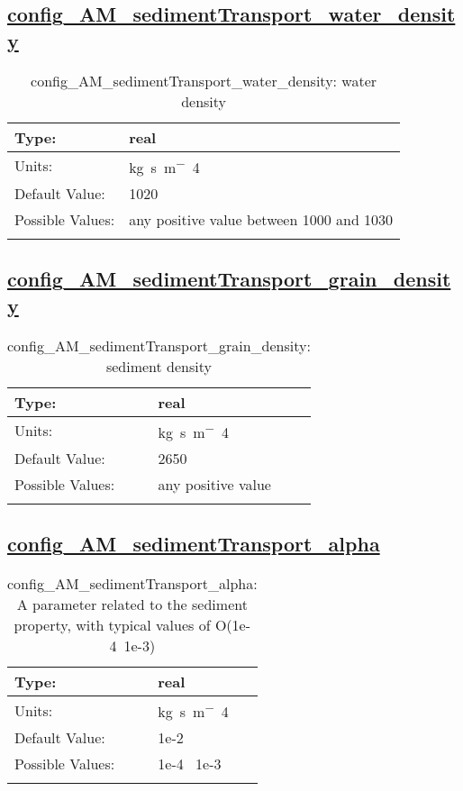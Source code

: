 \subsection[config\_AM\_sedimentTransport\_water\_density]{\hyperref[sec:nm_tab_AM_sedimentTransport]{config\_AM\_sedimentTransport\_water\_density}}
\label{subsec:nm_sec_config_AM_sedimentTransport_water_density}
\begin{center}
\begin{longtable}{| p{2.0in} || p{4.0in} |}
    \hline
    Type: & real \\
    \hline
    Units: & \si{kg.s.m^-4} \\
    \hline
    Default Value: & 1020 \\
    \hline
    Possible Values: & any positive value between 1000 and 1030 \\
    \hline
    \caption{config\_AM\_sedimentTransport\_water\_density: water density}
\end{longtable}
\end{center}
\subsection[config\_AM\_sedimentTransport\_grain\_density]{\hyperref[sec:nm_tab_AM_sedimentTransport]{config\_AM\_sedimentTransport\_grain\_density}}
\label{subsec:nm_sec_config_AM_sedimentTransport_grain_density}
\begin{center}
\begin{longtable}{| p{2.0in} || p{4.0in} |}
    \hline
    Type: & real \\
    \hline
    Units: & \si{kg.s.m^-4} \\
    \hline
    Default Value: & 2650 \\
    \hline
    Possible Values: & any positive value \\
    \hline
    \caption{config\_AM\_sedimentTransport\_grain\_density: sediment density}
\end{longtable}
\end{center}
\subsection[config\_AM\_sedimentTransport\_alpha]{\hyperref[sec:nm_tab_AM_sedimentTransport]{config\_AM\_sedimentTransport\_alpha}}
\label{subsec:nm_sec_config_AM_sedimentTransport_alpha}
\begin{center}
\begin{longtable}{| p{2.0in} || p{4.0in} |}
    \hline
    Type: & real \\
    \hline
    Units: & \si{kg.s.m^-4} \\
    \hline
    Default Value: & 1e-2 \\
    \hline
    Possible Values: & 1e-4 ~1e-3 \\
    \hline
    \caption{config\_AM\_sedimentTransport\_alpha: A parameter related to the sediment property, with typical values of O(1e-4~1e-3)}
\end{longtable}
\end{center}
